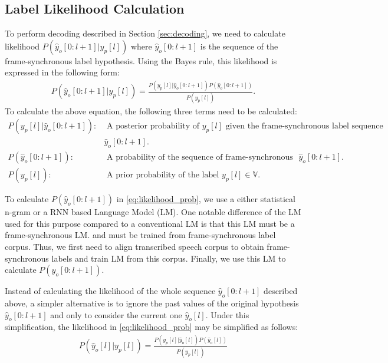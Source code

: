 \documentclass{article}
\begin{document}
\subsection{Label Likelihood Calculation}
To perform decoding described in Section \ref{sec:decoding}, 
we need to calculate likelihood $P(\hat{y}_o[0:l+1] | y_p[l])$
where $\hat{y}_o[0:l+1]$ is the sequence of the frame-synchronous 
label hypothesis.
Using the Bayes rule, this likelihood is expressed in the following form:
\begin{align}
  P(\hat{y}_o[0:l+1] \big| y_p[l]) 
    = \frac{P(y_p[l] \big| \hat{y}_o[0:l+1])
        P\left(\hat{y}_o[0:l+1] \right)}{P(y_p[l])}.
  \label{eq:likelihood_prob}
\end{align}
To calculate the above equation, the following three terms need to be
calculated:
\begin{align}
  P(y_p[l] \big| \hat{y}_o[0:l+1]): & \text{ A posterior probability of } y_p[l]
    \text{ given the frame-synchronous label sequence } \nonumber \\ 
    & \hat{y}_o[0:l+1].
    \nonumber \\
  P\left(\hat{y}_o[0:l+1] \right): & 
    \text{ A probability of the sequence of frame-synchronous labels } \hat{y}_o[0:l+1].
      \nonumber \\
  P(y_p[l]): & \text{ A prior probability of the label } y_p[l] \in \mathbb{V}.
  \label{eq:prob_components_likelihood}
\end{align}

To calculate $P\left(\hat{y}_o[0:l+1] \right)$ in \eqref{eq:likelihood_prob}, 
we use a either statistical n-gram or a RNN based Language Model (LM). 
One notable difference of the LM used for this purpose compared 
to a conventional LM is that this LM must be a frame-synchronous LM.
and must be trained from frame-synchronous label corpus. 
Thus, we first need to align transcribed speech corpus to obtain frame-synchronous 
labels and train LM from this corpus. 
Finally, we use this LM to calculate $P\left(\hat{y}_o[0:l+1] \right)$.

Instead of calculating the likelihood of the whole sequence 
$\hat{y}_o[0:l+1]$ described above, a simpler alternative is to ignore
the past values of the original hypothesis $\hat{y}_o[0:l+1]$ and only to
consider the current one $\hat{y}_o[l]$. Under this simplification,
the likelihood in \eqref{eq:likelihood_prob} may be simplified as follows:
\begin{align}
  P(\hat{y}_o[l] \big| y_p[l]) 
    = \frac{P (y_p[l] \big| \hat{y}_o[l]) P(\hat{y}_o[l])}{P(y_p[l])} 
\end{align}
\end{document}
